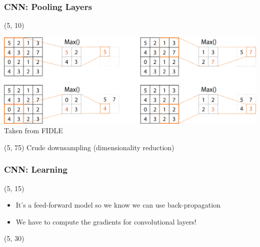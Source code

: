 \begin{frame}[label=Pooling_Layers]
  \frametitle{\acl{CNN}: Pooling Layers}

  \begin{textblock}{90}(5, 10)
    \begin{center}
      \includegraphics[width=\textwidth]{img/CNN_Pooling.png}
      Taken from FIDLE
    \end{center}
  \end{textblock}

  \begin{textblock}{45}(5, 75)
    Crude downsampling (dimensionality reduction)\\
  \end{textblock}
\end{frame}


\begin{frame}
  \frametitle{\acl{CNN}: Learning}

  \begin{textblock}{90}(5, 15)
    \begin{itemize}
    \item<1-> It's a feed-forward model so we know we can use back-propagation
    \item<2-> We have to compute the gradients for convolutional layers!
    \end{itemize}
  \end{textblock}

  \begin{textblock}{90}(5, 30)
  \end{textblock}
\end{frame}


